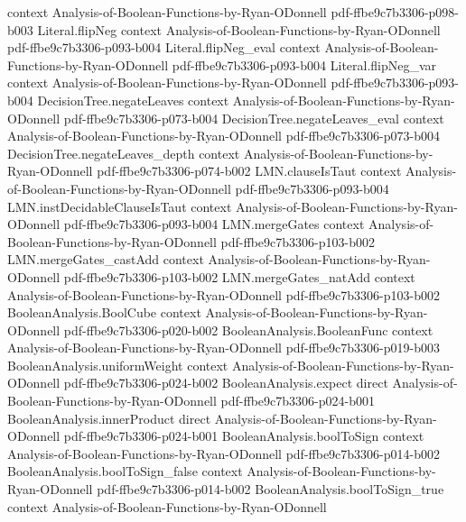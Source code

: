 \begin{theorem}
  {context}
  {Analysis-of-Boolean-Functions-by-Ryan-ODonnell}
  {pdf-ffbe9c7b3306-p098-b003}
\proofstep
  {Literal.flipNeg}
  {context}
  {Analysis-of-Boolean-Functions-by-Ryan-ODonnell}
  {pdf-ffbe9c7b3306-p093-b004}
\proofstep
  {Literal.flipNeg_eval}
  {context}
  {Analysis-of-Boolean-Functions-by-Ryan-ODonnell}
  {pdf-ffbe9c7b3306-p093-b004}
\proofstep
  {Literal.flipNeg_var}
  {context}
  {Analysis-of-Boolean-Functions-by-Ryan-ODonnell}
  {pdf-ffbe9c7b3306-p093-b004}
\proofstep
  {DecisionTree.negateLeaves}
  {context}
  {Analysis-of-Boolean-Functions-by-Ryan-ODonnell}
  {pdf-ffbe9c7b3306-p073-b004}
\proofstep
  {DecisionTree.negateLeaves_eval}
  {context}
  {Analysis-of-Boolean-Functions-by-Ryan-ODonnell}
  {pdf-ffbe9c7b3306-p073-b004}
\proofstep
  {DecisionTree.negateLeaves_depth}
  {context}
  {Analysis-of-Boolean-Functions-by-Ryan-ODonnell}
  {pdf-ffbe9c7b3306-p074-b002}
\proofstep
  {LMN.clauseIsTaut}
  {context}
  {Analysis-of-Boolean-Functions-by-Ryan-ODonnell}
  {pdf-ffbe9c7b3306-p093-b004}
\proofstep
  {LMN.instDecidableClauseIsTaut}
  {context}
  {Analysis-of-Boolean-Functions-by-Ryan-ODonnell}
  {pdf-ffbe9c7b3306-p093-b004}
\proofstep
  {LMN.mergeGates}
  {context}
  {Analysis-of-Boolean-Functions-by-Ryan-ODonnell}
  {pdf-ffbe9c7b3306-p103-b002}
\proofstep
  {LMN.mergeGates_castAdd}
  {context}
  {Analysis-of-Boolean-Functions-by-Ryan-ODonnell}
  {pdf-ffbe9c7b3306-p103-b002}
\proofstep
  {LMN.mergeGates_natAdd}
  {context}
  {Analysis-of-Boolean-Functions-by-Ryan-ODonnell}
  {pdf-ffbe9c7b3306-p103-b002}
\proofstep
  {BooleanAnalysis.BoolCube}
  {context}
  {Analysis-of-Boolean-Functions-by-Ryan-ODonnell}
  {pdf-ffbe9c7b3306-p020-b002}
\proofstep
  {BooleanAnalysis.BooleanFunc}
  {context}
  {Analysis-of-Boolean-Functions-by-Ryan-ODonnell}
  {pdf-ffbe9c7b3306-p019-b003}
\proofstep
  {BooleanAnalysis.uniformWeight}
  {context}
  {Analysis-of-Boolean-Functions-by-Ryan-ODonnell}
  {pdf-ffbe9c7b3306-p024-b002}
\proofstep
  {BooleanAnalysis.expect}
  {direct}
  {Analysis-of-Boolean-Functions-by-Ryan-ODonnell}
  {pdf-ffbe9c7b3306-p024-b001}
\proofstep
  {BooleanAnalysis.innerProduct}
  {direct}
  {Analysis-of-Boolean-Functions-by-Ryan-ODonnell}
  {pdf-ffbe9c7b3306-p024-b001}
\proofstep
  {BooleanAnalysis.boolToSign}
  {context}
  {Analysis-of-Boolean-Functions-by-Ryan-ODonnell}
  {pdf-ffbe9c7b3306-p014-b002}
\proofstep
  {BooleanAnalysis.boolToSign_false}
  {context}
  {Analysis-of-Boolean-Functions-by-Ryan-ODonnell}
  {pdf-ffbe9c7b3306-p014-b002}
\proofstep
  {BooleanAnalysis.boolToSign_true}
  {context}
  {Analysis-of-Boolean-Functions-by-Ryan-ODonnell}

\end{theorem}
